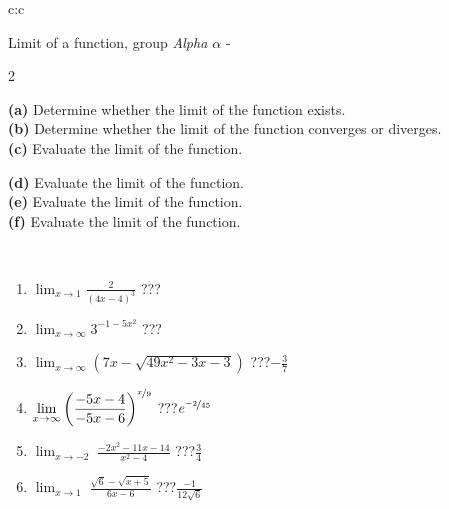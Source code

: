 \documentclass[10pt]{report}
\begin{document}
\thispagestyle{empty}
\begin{tabular}{c:c}
\begin{minipage}[c][104.5mm][t]{0.5\linewidth}
\begin{center}
\vspace{5mm}
{\huge Limit of a function, group \textit{Alpha $\alpha$} -}\\[5mm]
\begin{minipage}{0.95\linewidth}
\begin{center}
{\small \begin{multicols}{2} \raggedright
\textbf{(a)} Determine whether the limit of the function exists. \\[1mm]
\textbf{(b)} Determine whether the limit of the function converges or diverges. \\[1mm]
\textbf{(c)} Evaluate the limit of the function. \par \columnbreak
\textbf{(d)} Evaluate the limit of the function. \\[1mm]
\textbf{(e)} Evaluate the limit of the function. \\[1mm]
\textbf{(f)} Evaluate the limit of the function. \\[1mm]
\end{multicols}
}
\end{center}
\end{minipage}
\\[1mm]
\begin{minipage}{0.79\linewidth}
\begin{center}
\begin{varwidth}{\linewidth}
\setlength{\itemsep}{0pt}
\begin{enumerate}
\normalsize
\item $\displaystyle\lim_{x\to1}{\frac{2}{(4x-4)^{3}}}$\quad \dotfill\; ???\;\dotfill \quad {}
\item $\displaystyle\lim_{x\to\infty}{3^{-1-5x^2}}$\quad \dotfill\; ???\;\dotfill \quad {}
\item $\displaystyle\lim_{x\to\infty}{\left(7x - \sqrt{49x^2-3x-3}\right)}$\quad \dotfill\; ???\;\dotfill \quad $-\frac{3}{7}$
\item $\displaystyle\lim_{x\to\infty}{\left( \frac{-5x-4}{-5x-6} \right)^{\nicefrac{x}{9}}}$\quad \dotfill\; ???\;\dotfill \quad $e^{\nicefrac{-2}{45}}$
\item $\displaystyle\lim_{x\to -2}{\;\frac{-2x^2-11x-14}{x^2-4}}$\quad \dotfill\; ???\;\dotfill \quad $\frac{3}{4}$
\item $\displaystyle\lim_{x\to 1}{\;\frac{\sqrt{6}-\sqrt{x+5}}{6x-6}}$\quad \dotfill\; ???\;\dotfill \quad $\frac{-1}{12\sqrt{6}}$

\end{enumerate}
\end{varwidth}
\end{center}
\end{minipage}
\end{center}
\end{minipage}
\end{tabular}
\end{document}
